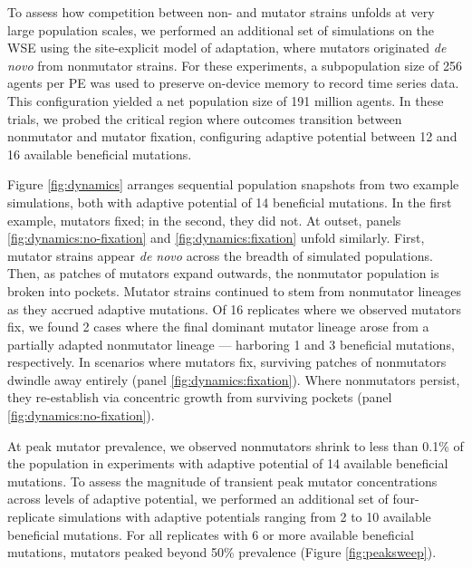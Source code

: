 To assess how competition between non- and mutator strains unfolds at very large population scales, we performed an additional set of simulations on the WSE using the site-explicit model of adaptation, where mutators originated \textit{de novo} from nonmutator strains.
For these experiments, a subpopulation size of 256 agents per PE was used to preserve on-device memory to record time series data.
This configuration yielded a net population size of 191 million agents.
In these trials, we probed the critical region where outcomes transition between nonmutator and mutator fixation, configuring adaptive potential between 12 and 16 available beneficial mutations.



Figure \ref{fig:dynamics} arranges sequential population snapshots from two example simulations, both with adaptive potential of 14 beneficial mutations.
In the first example, mutators fixed; in the second, they did not.
At outset, panels \ref{fig:dynamics:no-fixation} and \ref{fig:dynamics:fixation} unfold similarly.
First, mutator strains appear \textit{de novo} across the breadth of simulated populations.
Then, as patches of mutators expand outwards, the nonmutator population is broken into pockets.
Mutator strains continued to stem from nonmutator lineages as they accrued adaptive mutations.
Of 16 replicates where we observed mutators fix, we found 2 cases where the final dominant mutator lineage arose from a partially adapted nonmutator lineage --- harboring 1 and 3 beneficial mutations, respectively.
In scenarios where mutators fix, surviving patches of nonmutators dwindle away entirely (panel \ref{fig:dynamics:fixation}).
Where nonmutators persist, they re-establish via concentric growth from surviving pockets (panel \ref{fig:dynamics:no-fixation}).



At peak mutator prevalence, we observed nonmutators shrink to less than 0.1\% of the population in experiments with adaptive potential of 14 available beneficial mutations.
To assess the magnitude of transient peak mutator concentrations across levels of adaptive potential, we performed an additional set of four-replicate simulations with adaptive potentials ranging from 2 to 10 available beneficial mutations.
For all replicates with 6 or more available beneficial mutations, mutators peaked beyond 50\% prevalence (Figure \ref{fig:peaksweep}).

